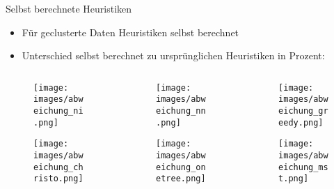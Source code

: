 \begin{frame}{Selbst berechnete Heuristiken}
    \begin{itemize}
        \item Für geclusterte Daten Heuristiken selbst berechnet
        \item Unterschied selbst berechnet zu ursprünglichen Heuristiken in Prozent:
    \end{itemize}
    \begin{columns}
        \begin{column}{0.33\textwidth}
            \begin{figure}
                \centering
                \texttt{[image: images/abweichung\_ni.png]}
            \end{figure}
            \vspace{-0.5cm}
            \begin{figure}
                \centering
                \texttt{[image: images/abweichung\_christo.png]}
            \end{figure}
        \end{column}
        \begin{column}{0.33\textwidth}
            \begin{figure}
                \centering
                \texttt{[image: images/abweichung\_nn.png]}
            \end{figure}
            \vspace{-0.5cm}
            \begin{figure}
                \centering
                \texttt{[image: images/abweichung\_onetree.png]}
            \end{figure}
        \end{column}
        \begin{column}{0.33\textwidth}
            \begin{figure}
                \centering
                \texttt{[image: images/abweichung\_greedy.png]}
            \end{figure}
            \vspace{-0.5cm}
            \begin{figure}
                \centering
                \texttt{[image: images/abweichung\_mst.png]}
            \end{figure}
        \end{column}
    \end{columns}
\end{frame}

